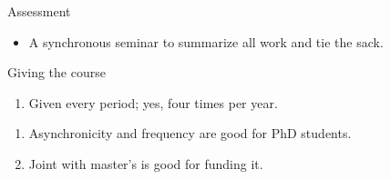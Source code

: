 \begin{frame}
\begin{columns}
\begin{column}{0.5\columnwidth}
\begin{figure}
      \end{figure}
    \end{column}
  \end{columns}
\end{frame}

\begin{frame}
  \begin{block}{Assessment}
    \begin{itemize}
      \item A synchronous seminar to summarize all work and tie the sack.
    \end{itemize}
  \end{block}
\end{frame}

\begin{frame}
  \begin{block}{Giving the course}
    \begin{enumerate}
      \item Given every period; yes, four times per year.
    \end{enumerate}
  \end{block}

  \pause

  \begin{remark}
    \begin{enumerate}
      \item Asynchronicity and frequency are good for PhD students.
      \item Joint with master's is good for funding it.
    \end{enumerate}
  \end{remark}
\end{frame}



